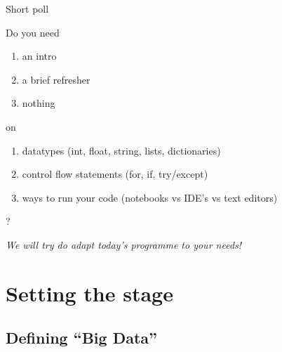 \documentclass[handout]{beamer}
\begin{document}
\begin{frame}{Short poll}

Do you need
\begin{enumerate}[a]
	\item an intro
	\item a brief refresher
	\item nothing
\end{enumerate}

on

\begin{enumerate}[i]
	\item datatypes (int, float, string, lists, dictionaries)
	\item control flow statements (for, if, try/except)
	\item ways to run your code (notebooks vs IDE's vs text editors)
\end{enumerate}
?

\emph{We will try do adapt today's programme to your needs!}

\end{frame}


\section{Setting the stage}

\subsection{Defining ``Big Data''}

{
	\begin{frame}[plain]
\end{frame}
}
\end{document}
